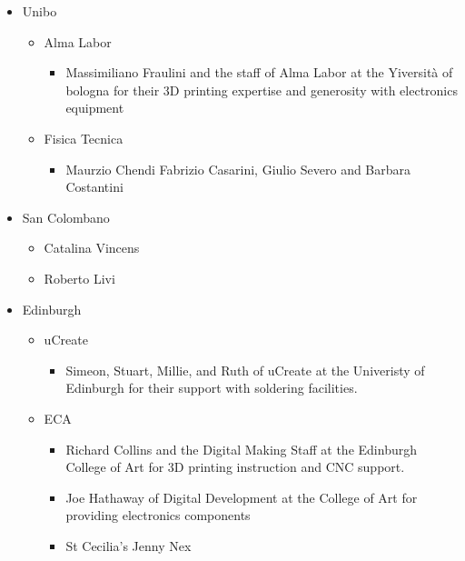 \begin{itemize}
\tightlist
\item
  Unibo

  \begin{itemize}
  \tightlist
  \item
    Alma Labor

    \begin{itemize}
    \tightlist
    \item
      Massimiliano Fraulini and the staff of Alma Labor at the Yiversità
      of bologna for their 3D printing expertise and generosity with
      electronics equipment
    \end{itemize}
  \item
    Fisica Tecnica

    \begin{itemize}
    \tightlist
    \item
      Maurzio Chendi Fabrizio Casarini, Giulio Severo and Barbara
      Costantini
    \end{itemize}
  \end{itemize}
\item
  San Colombano

  \begin{itemize}
  \tightlist
  \item
    Catalina Vincens
  \item
    Roberto Livi
  \end{itemize}
\item
  Edinburgh

  \begin{itemize}
  \tightlist
  \item
    uCreate

    \begin{itemize}
    \tightlist
    \item
      Simeon, Stuart, Millie, and Ruth of uCreate at the Univeristy of
      Edinburgh for their support with soldering facilities.
    \end{itemize}
  \item
    ECA

    \begin{itemize}
    \tightlist
    \item
      Richard Collins and the Digital Making Staff at the Edinburgh
      College of Art for 3D printing instruction and CNC support.
    \item
      Joe Hathaway of Digital Development at the College of Art for
      providing electronics components
    \item
      St Cecilia's Jenny Nex
    \end{itemize}
  \end{itemize}
\end{itemize}

